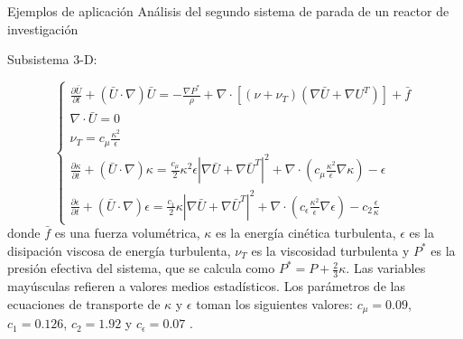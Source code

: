 \footnotesize
\begin{frame}
{Ejemplos de aplicación}
{Análisis del segundo sistema de parada de un reactor de investigación}

Subsistema 3-D:

\begin{equation*}
\left\{ \begin{array}{l}
\displaystyle \frac{\partial \bar{U} }{\partial t} + ( \bar{U} \cdot \nabla) \bar{U} = - \frac {\nabla P^*}{\rho} + 
\nabla \cdot \left[ \left( \nu + \nu_T \right) \left( \nabla \bar{U} + \nabla U^T \right) \right] +\bar{f} \\
\nabla \cdot \bar{U} =0 \\
\displaystyle \nu_T = c_\mu \frac{\kappa^2}{\epsilon} \\
\displaystyle \frac{\partial \kappa}{\partial t} + ( \bar{U} \cdot \nabla) \kappa = \frac{c_\mu} {2}{\kappa^2}{\epsilon} \left | \nabla \bar{U} + \nabla\bar{U}^T \right | ^2  
+ \nabla \cdot \left( c_\mu \frac{\kappa^2}{\epsilon} \nabla \kappa \right) - \epsilon \\
\displaystyle \frac{\partial {\epsilon}}{\partial t} + ( \bar{U} \cdot \nabla) \epsilon = \frac{c_1} {2} \kappa \left | \nabla \bar{U} + \nabla \bar{U}^T \right | ^2
+ \nabla \cdot \left( c_{\epsilon} \frac{\kappa^2}{\epsilon} \nabla \epsilon \right) - c_2 \frac{\epsilon}{\kappa}
\label{eq-mani}
\end{array} \right.
\end{equation*}
donde $\bar{f}$ es una fuerza volumétrica, 
$\kappa$ es la energía cinética turbulenta, $\epsilon$ es la disipación viscosa de energía turbulenta,
$\nu_T$ es la viscosidad turbulenta y $P^*$ es la presión efectiva del sistema, que se calcula como
$\displaystyle P^* = P + \frac {2}{3}\kappa$.
Las variables mayúsculas refieren a valores medios estadísticos.
Los parámetros de las ecuaciones de transporte de $\kappa$ y $\epsilon$ toman los siguientes valores:
$c_\mu=0.09$, $c_1=0.126$, $c_2=1.92$ y $c_\epsilon=0.07$ \cite{durbin}.

\end{frame}

